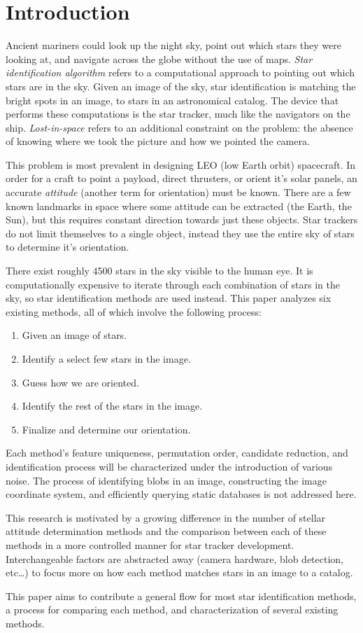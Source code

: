 \section{Introduction}\label{sec:introduction}
Ancient mariners could look up the night sky, point out which stars they were looking at, and navigate across the globe
without the use of maps.
\textit{Star identification algorithm} refers to a computational approach to pointing out which stars
are in the sky.
Given an image of the sky, star identification is matching the bright spots in an image, to stars in an astronomical
catalog.
The device that performs these computations is the star tracker, much like the navigators on the ship.
\textit{Lost-in-space} refers to an additional constraint on the problem: the absence of knowing where we took
the picture and how we pointed the camera.

This problem is most prevalent in designing LEO (low Earth orbit) spacecraft.
In order for a craft to point a payload, direct thrusters, or orient it's solar panels, an accurate
\textit{attitude} (another term for orientation) must be known.
There are a few known landmarks in space where some attitude can be extracted (the Earth, the Sun), but this
requires constant direction towards just these objects.
Star trackers do not limit themselves to a single object, instead they use the entire sky of stars to determine it's
orientation.

There exist roughly 4500 stars in the sky visible to the human eye.
It is computationally expensive to iterate through each combination of stars in the sky, so star identification methods
are used instead.
This paper analyzes six existing methods, all of which involve the following process:
\begin{enumerate}
    \item Given an image of stars.
    \item Identify a select few stars in the image.
    \item Guess how we are oriented.
    \item Identify the rest of the stars in the image.
    \item Finalize and determine our orientation.
\end{enumerate}

Each method's feature uniqueness, permutation order, candidate reduction, and identification process will be
characterized under the introduction of various noise.
The process of identifying blobs in an image, constructing the image coordinate system, and efficiently querying
static databases is not addressed here.

This research is motivated by a growing difference in the number of stellar attitude determination methods and the
comparison between each of these methods in a more controlled manner for star tracker development.
Interchangeable factors are abstracted away (camera hardware, blob detection, etc\ldots) to focus more on how each
method matches stars in an image to a catalog.

This paper aims to contribute a general flow for most star identification methods, a process for comparing each
method, and characterization of several existing methods.
